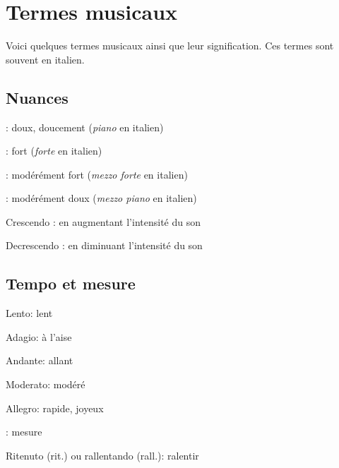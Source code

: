 \chapter{Termes musicaux}

Voici quelques termes musicaux ainsi que leur signification. Ces termes sont souvent en italien.

\section{Nuances}
\begin{description}
\item {} : doux, doucement (\emph{piano} en italien)
\item {} : fort (\emph{forte} en italien)
\item {} : modérément fort (\emph{mezzo forte} en italien)
\item {}: modérément doux (\emph{mezzo piano} en italien)
\item Crescendo \crescHairpin{}: en augmentant l'intensité du son
\item Decrescendo \decrescHairpin{}: en diminuant l'intensité du son
\end{description}

\section{Tempo et mesure}
\begin{description}
\item Lento: lent
\item Adagio: à l'aise
\item Andante: allant
\item Moderato: modéré
\item Allegro: rapide, joyeux
\item \lilyTimeC{}: mesure \index{\lilyTimeC{}}
\item Ritenuto (rit.) ou rallentando (rall.): ralentir
\end{description}

